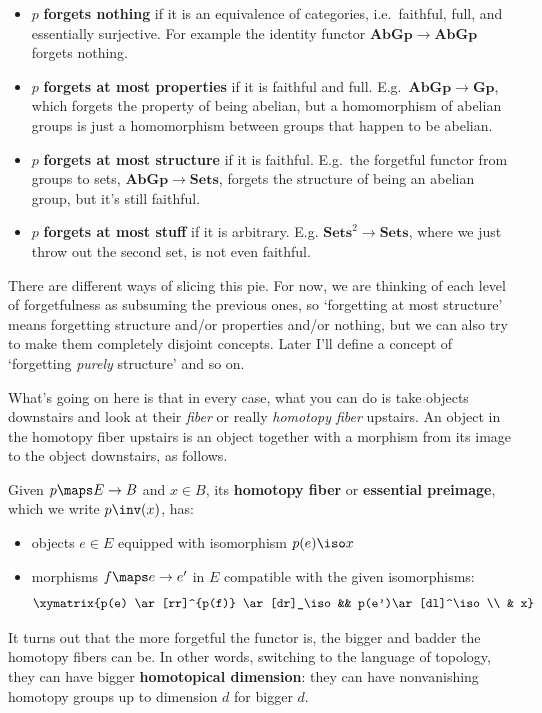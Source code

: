 \documentclass{amsart}
\begin{document}
\begin{itemize}
\item $p$ \textbf{forgets nothing} if it is an equivalence of categories,
  i.e.\ faithful, full, and essentially surjective.  For example
   the identity functor $\mathbf{AbGp}\to\mathbf{AbGp}$ forgets nothing.
\item $p$ \textbf{forgets at most properties} if it is faithful and
  full.  E.g.\ $\mathbf{AbGp}\to\mathbf{Gp}$, which forgets the
  property of being abelian, but a homomorphism of abelian groups is
  just a homomorphism between groups that happen to be abelian.
\item $p$ \textbf{forgets at most structure} if it is faithful.  E.g.\
  the forgetful functor from groups 
  to sets, $\mathbf{AbGp}\to\mathbf{Sets}$, forgets the structure of
  being an abelian group, but it's still faithful.
\item $p$ \textbf{forgets at most stuff} if it is arbitrary.  E.g.
  $\textbf{Sets}^2\to\mathbf{Sets}$, where we just throw out the
  second set, is not even faithful.
\end{itemize}

There are different ways of slicing this pie.
For now, we are thinking of each level of forgetfulness as
subsuming the previous ones, 
so `forgetting at most structure' means forgetting structure 
and/or properties and/or nothing, but we can also try to make
them completely disjoint concepts.  Later I'll define
a concept of `forgetting {\it purely} structure' and so on.

What's going on here is that in every case, what you can do is take
objects downstairs and look at their \emph{fiber} or really
\emph{homotopy fiber} upstairs.  An object in the homotopy fiber
upstairs is an object together with a morphism from its image to the
object downstairs, as follows.

Given $p\maps E\to B$ and $x\in B$, its \textbf{homotopy fiber} or
\textbf{essential preimage}, which we write $p\inv(x)$, has:
\begin{itemize}
\item objects $e\in E$ equipped with isomorphism $p(e)\iso x$
\item morphisms $f\maps  e \to e'$ in $E$ compatible with the 
  given isomorphisms:
  \[\xymatrix{p(e) \ar[rr]^{p(f)} \ar[dr]_\iso && p(e')\ar[dl]^\iso \\ & x}\]
\end{itemize}

It turns out that the more forgetful the functor is, the bigger and
badder the homotopy fibers can be.  In other words, switching to the 
language of topology, they can have bigger \textbf{homotopical dimension}: 
they can have nonvanishing homotopy groups up to dimension $d$ for bigger 
$d$.  
\end{document}

